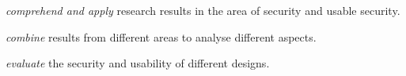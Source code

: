 \item \emph{comprehend and apply} research results in the area of security and 
  usable security.

\item \emph{combine} results from different areas to analyse different aspects.

\item \emph{evaluate} the security and usability of different designs.
